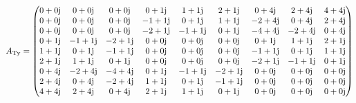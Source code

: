 {\footnotesize
\begin{equation}
A_\mathrm{Ty}=
\begin{pmatrix}
   0 + 0\mathrm{j} &  0 + 0\mathrm{j} &  0 + 0\mathrm{j} &   0 + 1\mathrm{j} &   1 + 1\mathrm{j} &   2 + 1\mathrm{j} &   0 + 4\mathrm{j} &   2 + 4\mathrm{j} &   4 + 4\mathrm{j} \\
   0 + 0\mathrm{j} &   0 + 0\mathrm{j} &  0 + 0\mathrm{j} &  -1 + 1\mathrm{j} &   0 + 1\mathrm{j} &   1 + 1\mathrm{j} &  -2 + 4\mathrm{j} &   0 + 4\mathrm{j} &   2 + 4\mathrm{j} \\
   0 + 0\mathrm{j} &   0 + 0\mathrm{j} &   0 + 0\mathrm{j} &  -2 + 1\mathrm{j} &  -1 + 1\mathrm{j} &   0 + 1\mathrm{j} &  -4 + 4\mathrm{j} &  -2 + 4\mathrm{j} &   0 + 4\mathrm{j} \\
   0 + 1\mathrm{j} &  -1 + 1\mathrm{j} &  -2 + 1\mathrm{j} &   0 + 0\mathrm{j} &  0 + 0\mathrm{j} &  0 + 0\mathrm{j} &   0 + 1\mathrm{j} &   1 + 1\mathrm{j} &   2 + 1\mathrm{j} \\
   1 + 1\mathrm{j} &   0 + 1\mathrm{j} &  -1 + 1\mathrm{j} &   0 + 0\mathrm{j} &   0 + 0\mathrm{j} &  0 + 0\mathrm{j} &  -1 + 1\mathrm{j} &   0 + 1\mathrm{j} &   1 + 1\mathrm{j} \\
   2 + 1\mathrm{j} &   1 + 1\mathrm{j} &   0 + 1\mathrm{j} &   0 + 0\mathrm{j} &   0 + 0\mathrm{j} &   0 + 0\mathrm{j} &  -2 + 1\mathrm{j} &  -1 + 1\mathrm{j} &   0 + 1\mathrm{j} \\
   0 + 4\mathrm{j} &  -2 + 4\mathrm{j} &  -4 + 4\mathrm{j} &   0 + 1\mathrm{j} &  -1 + 1\mathrm{j} &  -2 + 1\mathrm{j} &   0 + 0\mathrm{j} &  0 + 0\mathrm{j} &  0 + 0\mathrm{j} \\
   2 + 4\mathrm{j} &   0 + 4\mathrm{j} &  -2 + 4\mathrm{j} &   1 + 1\mathrm{j} &   0 + 1\mathrm{j} &  -1 + 1\mathrm{j} &   0 + 0\mathrm{j} &   0 + 0\mathrm{j} &  0 + 0\mathrm{j} \\
   4 + 4\mathrm{j} &   2 + 4\mathrm{j} &   0 + 4\mathrm{j} &   2 + 1\mathrm{j} &   1 + 1\mathrm{j} &   0 + 1\mathrm{j} &   0 + 0\mathrm{j} &   0 + 0\mathrm{j} &   0 + 0\mathrm{j} 
\end{pmatrix}
\end{equation}}

